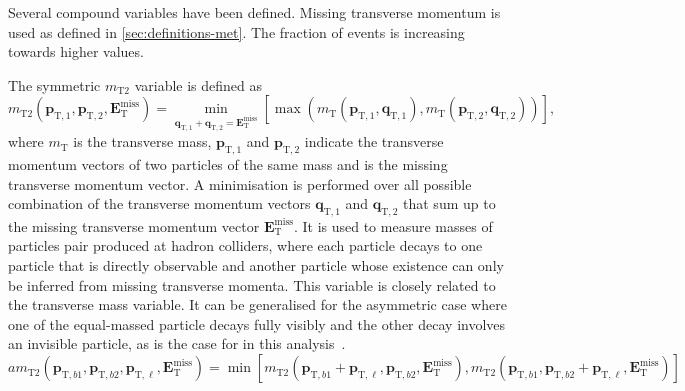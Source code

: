 \begin{table}[htbp]
  \begin{center}
    
  \end{center}
  \caption{Yields of individual signal and background samples in the
    bulk interference region.
    The total expected yield is using the nominal \tW DR sample.
    Uncertainties are statistical only.}%
  \label{tab:SR_Bulk_Final:yields}
\end{table}

Several compound variables have been defined. Missing transverse momentum is used
as defined in \cref{sec:definitions-met}. The fraction of \tW events is increasing
towards higher values.

The symmetric \(m_{\mathrm{T}2}\) variable is defined as
\begin{equation}
  m_{\mathrm{T}2}(\mathbf{p}_{\mathrm{T},1}, \mathbf{p}_{\mathrm{T},2},\mathbf{E}_{\mathrm{T}}^{\mathrm{miss}}) = \min_{{ \mathbf{q}_{\mathrm{T},1}+\mathbf{q}_{\mathrm{T},2}=\mathbf{E}_{\mathrm{T}}^{\mathrm{miss}}}}[\max(m_{\mathrm{T}}(\mathbf{p}_{\mathrm{T},1},\mathbf{q}_{\mathrm{T},1}),m_{\mathrm{T}}(\mathbf{p}_{\mathrm{T},2},\mathbf{q}_{\mathrm{T},2}))],
\end{equation}
where \(m_{\mathrm{T}}\) is the transverse mass, \(\mathbf{p}_{\mathrm{T},1}\) and  \(\mathbf{p}_{\mathrm{T},2}\) indicate the transverse momentum vectors of two particles of the same mass and \met is the missing transverse momentum vector.
A minimisation is performed over all possible combination of the transverse momentum vectors \(\mathbf{q}_{\mathrm{T},1}\) and \(\mathbf{q}_{\mathrm{T},2}\) that sum up to the missing transverse momentum vector \(\mathbf{E}_{\mathrm{T}}^{\mathrm{miss}}\).
It is used to measure masses of particles pair produced at hadron colliders,
where each particle decays to one particle that is directly observable and another
particle whose existence can only be inferred from missing transverse momenta.
This variable is closely related to the transverse mass variable.
It can be generalised for the asymmetric case where one of the equal-massed particle decays fully visibly
and the other decay involves an invisible particle, as is the case for \ttbar in this analysis~\cite{Lester:2014yga}.
\begin{equation}
  am_{\mathrm{T}2}(\mathbf{p}_{\mathrm{T},b1}, \mathbf{p}_{\mathrm{T},b2},\mathbf{p}_{\mathrm{T},\ell},\mathbf{E}_{\mathrm{T}}^{\mathrm{miss}}) = \min[m_{\mathrm{T}2}(\mathbf{p}_{\mathrm{T},b1}+\mathbf{p}_{\mathrm{T},\ell}, \mathbf{p}_{\mathrm{T},b2},\mathbf{E}_{\mathrm{T}}^{\mathrm{miss}}),m_{\mathrm{T}2}(\mathbf{p}_{\mathrm{T},b1}, \mathbf{p}_{\mathrm{T},b2}+\mathbf{p}_{\mathrm{T},\ell},\mathbf{E}_{\mathrm{T}}^{\mathrm{miss}})]
\end{equation}

